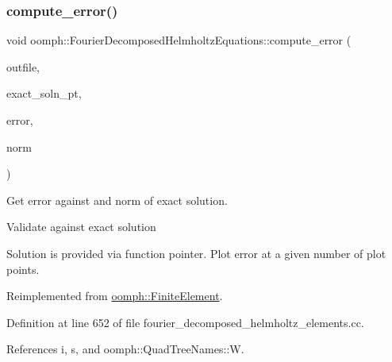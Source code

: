 \subsubsection{\texorpdfstring{compute\+\_\+error()}{compute\_error()}\hspace{0.1cm}{\footnotesize\ttfamily [1/2]}}
{\footnotesize\ttfamily void oomph\+::\+Fourier\+Decomposed\+Helmholtz\+Equations\+::compute\+\_\+error (\begin{DoxyParamCaption}\item[{std\+::ostream \&}]{outfile,  }\item[{\hyperlink{classoomph_1_1FiniteElement_a690fd33af26cc3e84f39bba6d5a85202}{Finite\+Element\+::\+Steady\+Exact\+Solution\+Fct\+Pt}}]{exact\+\_\+soln\+\_\+pt,  }\item[{double \&}]{error,  }\item[{double \&}]{norm }\end{DoxyParamCaption})\hspace{0.3cm}{\ttfamily [virtual]}}



Get error against and norm of exact solution. 

Validate against exact solution

Solution is provided via function pointer. Plot error at a given number of plot points. 

Reimplemented from \hyperlink{classoomph_1_1FiniteElement_a73c79a1f1e5b1d334757812a6bbd58ff}{oomph\+::\+Finite\+Element}.



Definition at line 652 of file fourier\+\_\+decomposed\+\_\+helmholtz\+\_\+elements.\+cc.



References i, s, and oomph\+::\+Quad\+Tree\+Names\+::W.

\mbox{\label{classoomph_1_1FourierDecomposedHelmholtzEquations_afcdb1ba877140cb1b4c66c0e55c2a8a1}} 
